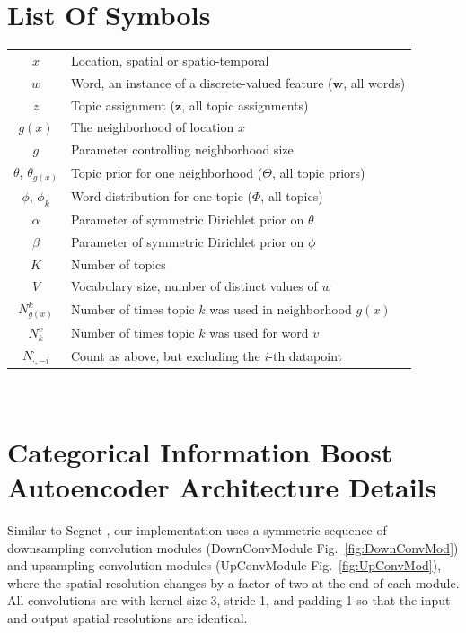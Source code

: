 
\begin{appendices}
\chapter{List Of Symbols}
\begin{tabular}{cp{\textwidth}}
  $x$ & Location, spatial or spatio-temporal \\
  $w$ & Word, an instance of a discrete-valued feature ($\textbf{w}$, all words) \\
  $z$ & Topic assignment ($\textbf{z}$, all topic assignments) \\
  $g(x)$ & The neighborhood of location $x$ \\
  $g$ & Parameter controlling neighborhood size \\
  $\theta$, $\theta_{g(x)}$ & Topic prior for one neighborhood ($\Theta$, all topic priors)\\
  $\phi$, $\phi_k$ & Word distribution for one topic ($\Phi$, all topics) \\
  $\alpha$ & Parameter of symmetric Dirichlet prior on $\theta$ \\
  $\beta$ & Parameter of symmetric Dirichlet prior on $\phi$ \\
  $K$ & Number of topics \\
  $V$ & Vocabulary size, number of distinct values of $w$ \\
  $N_{g(x)}^k$ & Number of times topic $k$ was used in neighborhood $g(x)$ \\
  $N_k^v$ & Number of times topic $k$ was used for word $v$ \\
  $N_{\cdot,-i}^\cdot$ & Count as above, but excluding the $i$-th datapoint
\end{tabular}\\

\chapter{Categorical Information Boost Autoencoder Architecture Details} \label{ch:cibae-arch}
Similar to Segnet \citep{BadrinarayananK15}, our implementation uses a symmetric sequence of downsampling convolution modules (DownConvModule Fig.~\ref{fig:DownConvMod}) and upsampling convolution modules (UpConvModule Fig.~\ref{fig:UpConvMod}), where the spatial resolution changes by a factor of two at the end of each module. All convolutions are with kernel size 3, stride 1, and padding 1 so that the input and output spatial resolutions are identical.


\end{appendices}

